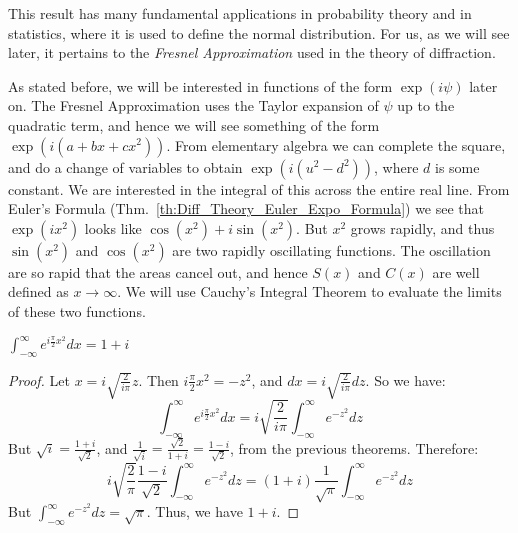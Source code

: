 \documentclass[crop=false,class=book,oneside]{standalone}
\begin{document}
            This result has many fundamental applications in
            probability theory and in statistics, where
            it is used to define the normal distribution.
            For us, as we will see later, it pertains to
            the \textit{Fresnel Approximation} used in
            the theory of diffraction.
            \par\hfill\par
            As stated before, we will be interested in functions
            of the form $\exp(i\psi)$ later on. The Fresnel
            Approximation uses the Taylor expansion of $\psi$
            up to the quadratic term, and hence we will see
            something of the form $\exp(i(a+bx+cx^2))$. From
            elementary algebra we can complete the square, and
            do a change of variables to obtain
            $\exp(i(u^{2}-d^{2}))$, where $d$ is some constant.
            We are interested in the integral of this across the
            entire real line. From Euler's Formula
            (Thm.~\ref{th:Diff_Theory_Euler_Expo_Formula}) we
            see that $\exp(ix^{2})$ looks like
            $\cos(x^{2})+i\sin(x^{2})$. But $x^{2}$ grows rapidly,
            and thus $\sin(x^{2})$ and $\cos(x^{2})$ are two
            rapidly oscillating functions. The oscillation are
            so rapid that the areas cancel out, and hence
            $S(x)$ and $C(x)$ are well defined as
            $x\rightarrow\infty$. We will use Cauchy's Integral
            Theorem to evaluate the limits of these two functions.
            \begin{theorem}
                $\int_{-\infty}^{\infty}e^{i\frac{\pi}{2}x^2}dx=1+i$
            \end{theorem}
            \begin{proof}
                Let $x = i\sqrt{\frac{2}{i\pi}}z$. Then
                $i\frac{\pi}{2}x^2 = -z^2$, and
                $dx=i\sqrt{\frac{2}{i\pi}}dz$. So we have:
                \begin{equation*}
                    \int_{-\infty}^{\infty}e^{i\frac{\pi}{2}x^2}dx
                    =i\sqrt{\frac{2}{i\pi}}
                    \int_{-\infty}^{\infty}e^{-z^2}dz    
                \end{equation*}
                But $\sqrt{i}=\frac{1+i}{\sqrt{2}}$, and
                $\frac{1}{\sqrt{i}}=\frac{\sqrt{2}}{1+i}= \frac{1-i}{\sqrt{2}}$,
                from the previous theorems. Therefore:
                \begin{equation*}
                    i\sqrt{\frac{2}{\pi}}\frac{1-i}{\sqrt{2}}
                    \int_{-\infty}^{\infty}e^{-z^2}dz
                    =(1+i)\frac{1}{\sqrt{\pi}}
                    \int_{-\infty}^{\infty}e^{-z^2}dz
                \end{equation*}
                But
                $\int_{-\infty}^{\infty}e^{-z^2}dz=\sqrt{\pi}$.
                Thus, we have $1+i$.
            \end{proof}
\end{document}

